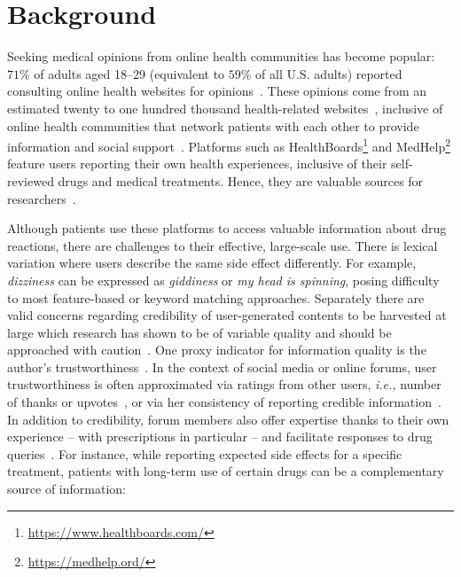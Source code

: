 \documentclass{bmcart}
\begin{document}


\section{Background}\label{sec:background}

Seeking medical opinions from online health communities has become popular: $71\%$ of adults aged 18--29 (equivalent to $59\%$ of all
U.S. adults) reported consulting online health
websites for opinions~\cite{fox2013health}.  These opinions come from an estimated
twenty to one hundred thousand health-related
websites~\cite{diaz2002patients}, inclusive of online health
communities that network patients with each other to provide
information and social support~\cite{johnston2013online}. Platforms
such as
HealthBoards\footnote{\scriptsize{\url{https://www.healthboards.com/}}}
and MedHelp\footnote{{\scriptsize{\url{https://medhelp.ord/}}}}
feature users reporting their own health experiences, inclusive of
their self-reviewed drugs and medical treatments.  Hence, they are
valuable sources for researchers~\cite{leyens2017use,martin2014big}.

Although patients use these platforms to access valuable information about drug reactions, there are challenges to their effective, large-scale use. There is lexical variation where users describe the same side effect differently.  For example, \textit{dizziness} can be expressed as
\textit{giddiness} or \textit{my head is spinning}, posing difficulty to most feature-based or keyword matching approaches. Separately there are valid concerns regarding credibility of user-generated contents to be harvested at large which research
has shown to be of variable quality and should be approached with caution~\cite{impicciatore1997reliability,peterson2003consumers,hajli2015credibility,poddar2019}. One proxy indicator for information quality is the author's trustworthiness~\cite{li2016survey}. In the context of social media or online forums, user trustworthiness is 
often approximated via ratings from other users, \textit{i.e.,} number of thanks or upvotes~\cite{rains2009health}, or via her consistency of reporting credible information~\cite{hoang2018authenticity,mukherjee2014people}. In addition to credibility, forum members also offer expertise thanks to their own experience -- with prescriptions in particular -- and facilitate responses to drug queries~\cite{vydiswaran2019identifying}. For instance, while reporting expected side effects for a specific treatment, patients with long-term use of certain drugs can be a complementary source of information:  %
\end{document}
